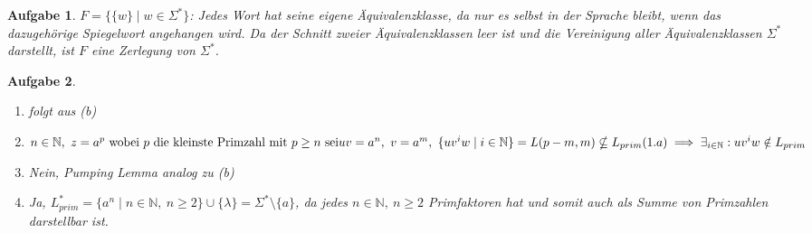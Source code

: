 \documentclass[11pt]{article}
\theoremstyle{break}
\newtheorem{task}{Aufgabe}
\begin{document}
\begin{task}
    $F = \{\{w\}\mid w\in \Sigma^*\}$: Jedes Wort hat seine eigene Äquivalenzklasse, da nur es selbst in der Sprache bleibt, wenn das dazugehörige Spiegelwort angehangen wird. Da der Schnitt zweier Äquivalenzklassen leer ist und die Vereinigung aller Äquivalenzklassen $\Sigma^*$ darstellt, ist $F$ eine Zerlegung von $\Sigma^*$.
\end{task}

\begin{task}
    \hfill\vspace{-5mm}
    \begin{enumerate} [label={(\alph*)}]
        \item folgt aus (b)
        \item $n\in \mathbb{N},\ z = a^p\text{ wobei } p \text{ die kleinste Primzahl mit } p\geq n \text{ sei}\\ uv = a^n,\ v = a^m,\ \{uv^i w \mid i\in \mathbb{N}\} = L(p-m, m)\nsubseteq L_{prim}(1.a)\implies \exists_{i\in\mathbb{N}}: uv^i w \notin L_{prim}$
        \item Nein, Pumping Lemma analog zu (b)
        \item Ja, $L_{prim}^* = \{ a^n\mid n\in\mathbb{N},\ n\geq 2 \}\cup\{\lambda\} = \Sigma^*\setminus\{a\}$, da jedes $n\in \mathbb{N},\ n\geq 2$ Primfaktoren hat und somit auch als Summe von Primzahlen darstellbar ist.
    \end{enumerate}
\end{task}
\end{document}
